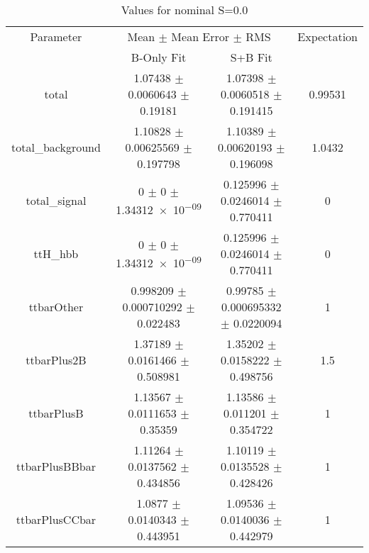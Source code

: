 \begin{table}
\centering
\caption{Values for nominal S=0.0}
\begin{tabular}{cccc}
\toprule
Parameter & \multicolumn{2}{c}{Mean $\pm$ Mean Error $\pm$ RMS} & Expectation\\
 & B-Only Fit & S+B Fit & \\
\midrule
total & \num{1.07438} $\pm$ \num{0.0060643} $\pm$ \num{0.19181} & \num{1.07398} $\pm$ \num{0.0060518} $\pm$ \num{0.191415} & \num{0.99531}\\
total\_background & \num{1.10828} $\pm$ \num{0.00625569} $\pm$ \num{0.197798} & \num{1.10389} $\pm$ \num{0.00620193} $\pm$ \num{0.196098} & \num{1.0432}\\
total\_signal & \num{0} $\pm$ \num{0} $\pm$ \num{1.34312e-09} & \num{0.125996} $\pm$ \num{0.0246014} $\pm$ \num{0.770411} & \num{0}\\
ttH\_hbb & \num{0} $\pm$ \num{0} $\pm$ \num{1.34312e-09} & \num{0.125996} $\pm$ \num{0.0246014} $\pm$ \num{0.770411} & \num{0}\\
ttbarOther & \num{0.998209} $\pm$ \num{0.000710292} $\pm$ \num{0.022483} & \num{0.99785} $\pm$ \num{0.000695332} $\pm$ \num{0.0220094} & \num{1}\\
ttbarPlus2B & \num{1.37189} $\pm$ \num{0.0161466} $\pm$ \num{0.508981} & \num{1.35202} $\pm$ \num{0.0158222} $\pm$ \num{0.498756} & \num{1.5}\\
ttbarPlusB & \num{1.13567} $\pm$ \num{0.0111653} $\pm$ \num{0.35359} & \num{1.13586} $\pm$ \num{0.011201} $\pm$ \num{0.354722} & \num{1}\\
ttbarPlusBBbar & \num{1.11264} $\pm$ \num{0.0137562} $\pm$ \num{0.434856} & \num{1.10119} $\pm$ \num{0.0135528} $\pm$ \num{0.428426} & \num{1}\\
ttbarPlusCCbar & \num{1.0877} $\pm$ \num{0.0140343} $\pm$ \num{0.443951} & \num{1.09536} $\pm$ \num{0.0140036} $\pm$ \num{0.442979} & \num{1}\\
\bottomrule
\end{tabular}
\end{table}